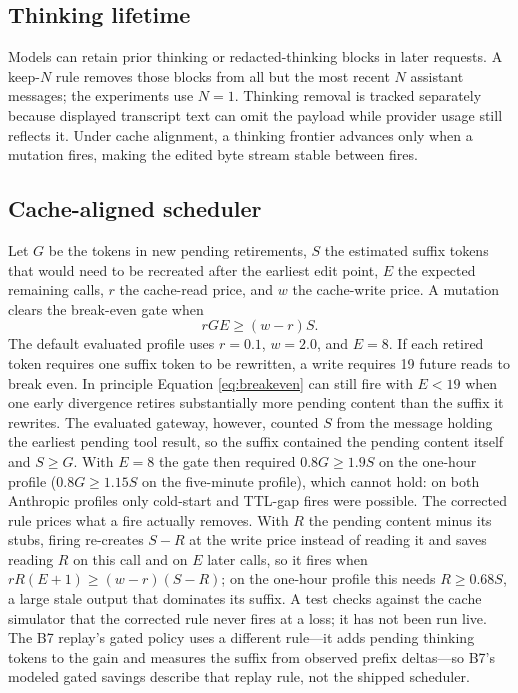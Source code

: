 \documentclass[10pt,twocolumn]{article}
\begin{document}
\subsection{Thinking lifetime}

Models can retain prior thinking or redacted-thinking blocks in later requests.  A keep-$N$ rule
removes those blocks from all but the most recent $N$ assistant messages; the experiments use
$N=1$.  Thinking removal is tracked separately because displayed transcript text can omit the
payload while provider usage still reflects it.  Under cache alignment, a thinking frontier advances
only when a mutation fires, making the edited byte stream stable between fires.

\subsection{Cache-aligned scheduler}
\label{sec:scheduler}

Let $G$ be the tokens in new pending retirements, $S$ the estimated suffix tokens that would need to
be recreated after the earliest edit point, $E$ the expected remaining calls, $r$ the cache-read price,
and $w$ the cache-write price.  A mutation clears the break-even gate when
\begin{equation}
rGE \ge (w-r)S. \label{eq:breakeven}
\end{equation}
The default evaluated profile uses $r=0.1$, $w=2.0$, and $E=8$.  If each retired token requires one
suffix token to be rewritten, a write requires 19 future reads to break even.  In principle Equation
\ref{eq:breakeven} can still fire with $E<19$ when one early divergence retires substantially more
pending content than the suffix it rewrites.  The evaluated gateway, however, counted $S$ from the
message holding the earliest pending tool result, so the suffix contained the pending content itself
and $S\ge G$.  With $E=8$ the gate then required $0.8G\ge1.9S$ on the one-hour profile ($0.8G\ge1.15S$
on the five-minute profile), which cannot hold: on both Anthropic profiles only cold-start and TTL-gap
fires were possible.  The corrected rule prices what a fire actually removes.  With $R$ the pending
content minus its stubs, firing re-creates $S-R$ at the write price instead of reading it and saves
reading $R$ on this call and on $E$ later calls, so it fires when $rR(E+1)\ge(w-r)(S-R)$; on the
one-hour profile this needs $R\ge0.68S$, a large stale output that dominates its suffix.  A test
checks against the cache simulator that the corrected rule never fires at a loss; it has not been run
live.  The B7 replay's gated policy uses a
different rule---it adds pending thinking tokens to the gain and measures the suffix from observed
prefix deltas---so B7's modeled gated savings describe that replay rule, not the shipped scheduler.
\end{document}
